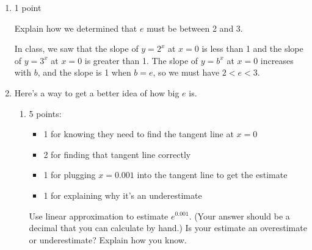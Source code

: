 \documentclass{article}
\begin{document}
\begin{enumerate}
\begin{enumerate}
    \begin{problem}[\vfill]
      In class, how did we define the number $e$? 
    \end{problem}

    \begin{solution} %
      We defined $e$ to be the number with the property that the line tangent to the graph of $y = e^x$ at $x = 0$ had slope 1. 
    \end{solution}

  \item \label{e-between-2-and-3}

    \begin{grading}
      1 point
    \end{grading}

    \begin{problem}[\vfill\newpage]
      Explain how we determined that $e$ must be between 2 and 3. 
    \end{problem}

    \begin{solution} %
      In class, we saw that the slope of $y = 2^x$ at $x = 0$ is less than 1 and the slope of $y = 3^x$ at $x = 0$ is greater than 1. The slope of $y = b^x$ at $x = 0$ increases with $b$, and the slope is 1 when $b = e$, so we must have $2 < e < 3$.
    \end{solution}

  \item
    Here's a way to get a better idea of how big $e$ is.  
    \begin{enumerate}
    \item

      \begin{grading}
        5 points:
        \begin{itemize}[nosep]
        \item 1 for knowing they need to find the tangent line at $x = 0$
        \item 2 for finding that tangent line correctly 
        \item 1 for plugging $x = 0.001$ into the tangent line to get the estimate
        \item 1 for explaining why it's an underestimate 
        \end{itemize}
      \end{grading}

      \begin{problem}[\vfill]
        Use linear approximation to estimate $e^{0.001}$. (Your answer should be a decimal that you can calculate by hand.) Is your estimate an overestimate or underestimate? Explain how you know.
      \end{problem}


\end{enumerate}
\end{enumerate}
\end{enumerate}
\end{document}
